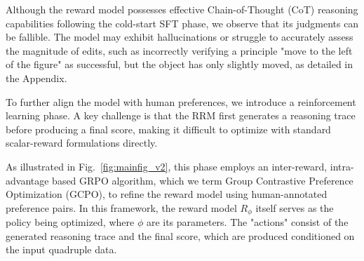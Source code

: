 Although the reward model possesses effective Chain-of-Thought (CoT) reasoning capabilities following the cold-start SFT phase, we observe that its judgments can be fallible. The model may exhibit hallucinations or struggle to accurately assess the magnitude of edits, such as incorrectly verifying a principle "move to the left of the figure" as successful, but the object has only slightly moved, as detailed in the Appendix. 

To further align the model with human preferences, we introduce a reinforcement learning phase.
A key challenge is that the RRM first generates a reasoning trace before producing a final score, making it difficult to optimize with standard scalar-reward formulations directly.




As illustrated in Fig.~\ref{fig:mainfig_v2}, this phase employs an inter-reward, intra-advantage based GRPO algorithm, which we term Group Contrastive Preference Optimization (GCPO), to refine the reward model using human-annotated preference pairs. In this framework, the reward model $R_\phi$ itself serves as the policy being optimized, where $\phi$ are its parameters. The "actions" consist of the generated reasoning trace and the final score, which are produced conditioned on the input quadruple data.

\vspace{-.5em}
